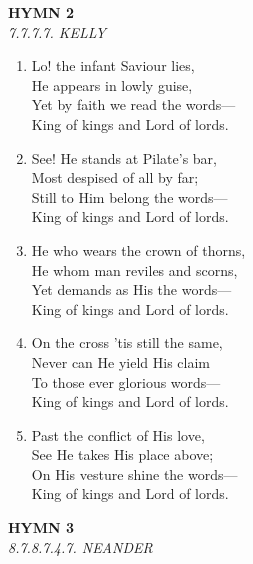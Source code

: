 \documentclass[11pt,a4paper]{article}
\begin{document}
\newpage
\begin{center}
    {\Large \textbf{HYMN 2}}
    \\
    \textit{7.7.7.7. KELLY}
\end{center}
\vspace{1em}

\begin{enumerate}
    \item Lo! the infant Saviour lies, \\
        He appears in lowly guise, \\
        Yet by faith we read the words--- \\
        King of kings and Lord of lords.

    \item See! He stands at Pilate's bar, \\
        Most despised of all by far; \\
        Still to Him belong the words--- \\
        King of kings and Lord of lords.

    \item He who wears the crown of thorns, \\
        He whom man reviles and scorns, \\
        Yet demands as His the words--- \\
        King of kings and Lord of lords.

    \item On the cross 'tis still the same, \\
        Never can He yield His claim \\
        To those ever glorious words--- \\
        King of kings and Lord of lords.

    \item Past the conflict of His love, \\
        See He takes His place above; \\
        On His vesture shine the words--- \\
        King of kings and Lord of lords.

\end{enumerate}

\newpage
\begin{center}
    {\Large \textbf{HYMN 3}}
    \\
    \textit{8.7.8.7.4.7. NEANDER}
\end{center}
\vspace{1em}
\end{document}
